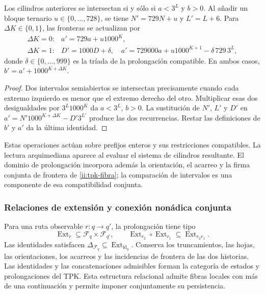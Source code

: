 \begin{lemma}
\label{ii:tpk-cilindros-enteros}
Los cilindros anteriores se intersectan si y sólo si
\(a<3^L\) y \(b>0\). Al añadir un bloque ternario
\(u\in\{0,\ldots,728\}\), se tiene \(N'=729N+u\) y
\(L'=L+6\). Para \(\Delta K\in\{0,1\}\), las fronteras se
actualizan por
\[
 \begin{array}{ll}
 \Delta K=0:&a'=729a+u1000^K,\\[2pt]
 \Delta K=1:&D'=1000D+\delta,\quad
 a'=729000a+u1000^{K+1}-\delta\,729\,3^L,
 \end{array}
\]
donde \(\delta\in\{0,\ldots,999\}\) es la tríada de la
prolongación compatible. En ambos casos,
\(b'=a'+1000^{K+\Delta K}\).
\end{lemma}
\begin{proof}
Dos intervalos semiabiertos se intersectan precisamente cuando cada extremo
izquierdo es menor que el extremo derecho del otro. Multiplicar esas dos
desigualdades por \(3^L1000^K\) da \(a<3^L\), \(b>0\).
La sustitución de \(N'\), \(L'\) y \(D'\) en
\(a'=N'1000^{K+\Delta K}-D'3^{L'}\) produce las dos recurrencias.
Restar las definiciones de \(b'\) y \(a'\) da la última identidad.
\end{proof}

Estas operaciones actúan sobre prefijos enteros y sus restricciones
compatibles. La lectura arquimediana aparece al evaluar el sistema de
cilindros resultante. El dominio de prolongación incorpora además la
orientación, el acarreo y la firma conjunta de frontera de
\eqref{ii:tpk-fibra}; la comparación de intervalos es una componente de
esa compatibilidad conjunta.

\subsubsection{Relaciones de extensión y conexión nonádica conjunta}

Para una ruta observable \(r:q\to q'\), la prolongación tiene tipo
\[
 \operatorname{Ext}_r\subseteq\mathcal F_q\times\mathcal F_{q'},
 \qquad
 \operatorname{Ext}_{r_2}\circ\operatorname{Ext}_{r_1}
 \subseteq\operatorname{Ext}_{r_2r_1}.
\]
Las identidades satisfacen
\(\Delta_{\mathcal F_q}\subseteq
\operatorname{Ext}_{\operatorname{id}_q}\).
Conserva los truncamientos, las hojas, las orientaciones, los acarreos y
las incidencias de frontera de las dos historias. Las identidades y las
concatenaciones admisibles forman la categoría de estados y prolongaciones
del TPK. Esta estructura relacional admite fibras locales con más de una
continuación y permite imponer conjuntamente su persistencia.

